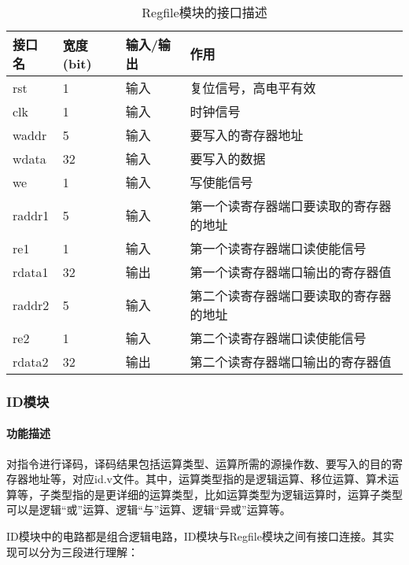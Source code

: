 \quad
\begin{table}[H]
	\centering
	\caption{Regfile模块的接口描述}
	\begin{tabular}{|l|l|l|l|}
		\hline
		接口名 & 宽度(bit) & 输入/输出 & 作用 \\
		\hline
		rst & 1 & 输入 & 复位信号，高电平有效 \\
		\hline
		clk & 1 & 输入 & 时钟信号 \\
		\hline
		waddr & 5 & 输入 & 要写入的寄存器地址 \\
		\hline
		wdata & 32 & 输入 & 要写入的数据 \\
		\hline
		we & 1 & 输入 & 写使能信号 \\
		\hline
		raddr1 & 5 & 输入 & 第一个读寄存器端口要读取的寄存器的地址 \\
		\hline
		re1 & 1 & 输入 & 第一个读寄存器端口读使能信号 \\
		\hline
		rdata1 & 32 & 输出 & 第一个读寄存器端口输出的寄存器值 \\
		\hline
		raddr2 & 5 & 输入 & 第二个读寄存器端口要读取的寄存器的地址 \\
		\hline
		re2 & 1 & 输入 & 第二个读寄存器端口读使能信号 \\
		\hline
		rdata2 & 32 & 输出 & 第二个读寄存器端口输出的寄存器值 \\
		\hline
	\end{tabular}
\end{table}
\subsubsection{ID模块}
\paragraph{功能描述}
\quad

\quad

对指令进行译码，译码结果包括运算类型、运算所需的源操作数、要写入的目的寄存器地址等，对应id.v文件。其中，运算类型指的是逻辑运算、移位运算、算术运算等，子类型指的是更详细的运算类型，比如运算类型为逻辑运算时，运算子类型可以是逻辑“或”运算、逻辑“与”运算、逻辑“异或”运算等。

ID模块中的电路都是组合逻辑电路，ID模块与Regfile模块之间有接口连接。其实现可以分为三段进行理解：

